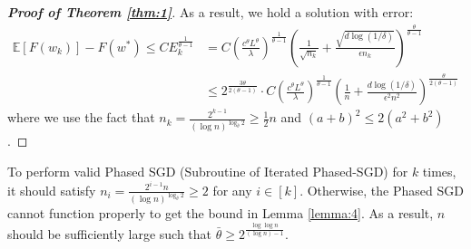 \documentclass[12pt]{alt2022} %
\renewcommand{\tilde}{\widetilde}
\begin{document}
\begin{proof}[{\bf Proof of Theorem \ref{thm:1}}]
		
		As a result, we hold a solution with error:
		\begin{equation*}
		\begin{aligned}
		\mathbb{E}[F(w_k)]-F(w^*)\leq C E_k^{\frac{1}{\theta-1}}&=C
		\left(\frac{c^{\theta}L^{\theta}}{\lambda}\right)^{\frac{1}{\theta-1}}\left(\frac{1}{\sqrt{n_k}}+\frac{\sqrt{d\log(1/\delta)}}{\epsilon n_k}\right)^{\frac{\theta}{\theta-1}}\\
		&\leq  2^{\frac{3\theta}{2(\theta-1)}}\cdot C
		\left(\frac{c^{\theta}L^{\theta}}{\lambda}\right)^{\frac{1}{\theta-1}}\left(\frac{1}{n}+\frac{d\log(1/\delta)}{\epsilon^2 n^2}\right)^{\frac{\theta}{2(\theta-1)}}
		\end{aligned}
		\end{equation*}
		where we use the fact that $n_k=\frac{2^{k-1}}{(\log n)^{\log_{\bar{\theta}}2}}\geq \frac{1}{2} n$ and $(a+b)^2\leq 2(a^2+b^2)$.
	\end{proof}
	\begin{remark}
To perform valid Phased SGD (Subroutine of Iterated Phased-SGD) for $k$ times, it should satisfy $n_i=\frac{2^{i-1}n}{(\log n)^{\log_{\bar{\theta}} 2}}\geq 2$ for any $i\in [k]$. Otherwise, the Phased SGD cannot function properly to get the bound in Lemma \ref{lemma:4}. As a result, $n$ should be sufficiently large such that $\bar{\theta} \geq2^{\frac{\log\log n}{(\log n)-1}}$.
	\end{remark}
  
       
      
      
\end{document}
